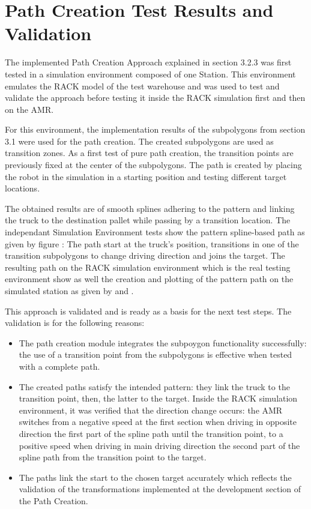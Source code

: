 \section{Path Creation Test Results and Validation}
The implemented Path Creation Approach explained in section 3.2.3 was first tested in a simulation environment
composed of one Station. This environment emulates the RACK model of the test warehouse and was used to test 
and validate the approach before testing it inside the RACK simulation first and then on the AMR.

For this environment, the implementation results of the subpolygons from section 3.1 were used for the path creation.
The created subpolygons are used as transition zones. 
As a first test of pure path creation, the transition points are previously fixed at the center of the 
subpolygons. The path is created by placing the robot in the simulation in a starting position and testing 
different target locations.

The obtained results are of smooth splines adhering to the pattern and linking the truck to the destination pallet 
while passing by a transition location. 
The independant Simulation Environment tests show the pattern spline-based path as given by figure :
The path start at the truck's position, transitions in one of the transition subpolygons to change driving 
direction and joins the target. 
The resulting path on the RACK simulation environment which is the real testing environment show as well 
the creation and plotting of the pattern path on the simulated station as given by  and .

This approach is validated and is ready as a basis for the next test steps. 
The validation is for the following reasons:
\begin{itemize}
    \item The path creation module integrates the subpoygon functionality successfully: the use of a transition
    point from the subpolygons is effective when tested with a complete path.
    \item The created paths satisfy the intended pattern: they link the truck to the transition point, then, 
    the latter to the target. Inside the RACK simulation environment, it was verified that the direction 
    change occurs: the AMR switches from a negative speed at the first section when driving in opposite 
    direction the first part of the spline path until the transition point, to a positive speed when driving in 
    main driving direction the second part of the spline path from the transition point to the target.
    \item The paths link the start to the chosen target accurately which reflects the validation of the 
    transformations implemented at the development section of the Path Creation.
\end{itemize}

